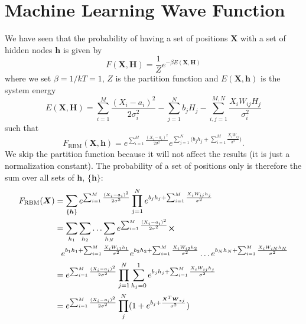 \chapter{Machine Learning Wave Function}
We have seen that the probability of having a set of positions $\boldsymbol{X}$ with a set of hidden nodes $\boldsymbol{h}$ is given by
\begin{equation}
F(\boldsymbol{X},\boldsymbol{H})=\frac{1}{Z}e^{-\beta E(\boldsymbol{X},\boldsymbol{H})}
\end{equation}
where we set $\beta=1/kT=1$, $Z$ is the partition function and $E(\boldsymbol{X},\boldsymbol{h})$ is the system energy
\begin{equation}
E(\boldsymbol{X},\boldsymbol{H})=\sum_{i=1}^{M}\frac{(X_i-a_i)^2}{2\sigma_i^2}-\sum_{j=1}^Nb_jH_j-\sum_{i,j=1}^{M,N}\frac{X_iW_{ij}H_j}{\sigma_i^2}
\end{equation}
such that
\begin{equation}
F_{\text{RBM}}(\boldsymbol{X},\boldsymbol{h})=e^{\sum_{i=1}^M \frac{(X_i - a_i)^2}{2\sigma^2}} e^{\sum_{j=1}^N\Big(b_jh_j+\sum_{i=1}^M\frac{X_iW_{ij}}{\sigma^2}\Big)}.
\end{equation}
We skip the partition function because it will not affect the results (it is just a normalization constant). The probability of a set of positions only is therefore the sum over all sets of $\boldsymbol{h}$, $\{\boldsymbol{h}\}$:
\begin{align}
F_{\text{RBM}}(\boldsymbol{X})&=\sum_{\{\boldsymbol{h}\}}e^{\sum_{i=1}^M \frac{(X_i - a_i)^2}{2\sigma^2}} \prod_{j=1}^Ne^{b_jh_j+\sum_{i=1}^M\frac{X_iW_{ij}h_j}{\sigma^2}}\notag\\
&=\sum_{h_1}\sum_{h_2}\hdots\sum_{h_N}e^{\sum_{i=1}^M \frac{(X_i - a_i)^2}{2\sigma^2}}\boldsymbol\times\notag\\
&\phantom{=}e^{b_1h_1+\sum_{i=1}^M\frac{X_iW_{i1}h_1}{\sigma^2}}e^{b_2h_2+\sum_{i=1}^M\frac{X_iW_{i2}h_2}{\sigma^2}}\hdots e^{b_Nh_N+\sum_{i=1}^M\frac{X_iW_{iN}h_N}{\sigma^2}}\notag\\
&=e^{\sum_{i=1}^M \frac{(X_i - a_i)^2}{2\sigma^2}}\prod_{j=1}^N\sum_{h_j=0}^1e^{b_jh_j+\sum_{i=1}^M \frac{X_i W_{ij}h_j}{\sigma^2}}\notag\\
&=e^{\sum_{i=1}^M \frac{(X_i - a_i)^2}{2\sigma^2}} \prod_j^N (1+ e^{b_j + \frac{\boldsymbol{X}^T\boldsymbol{W}_{*j}}{\sigma^2}})
\end{align}